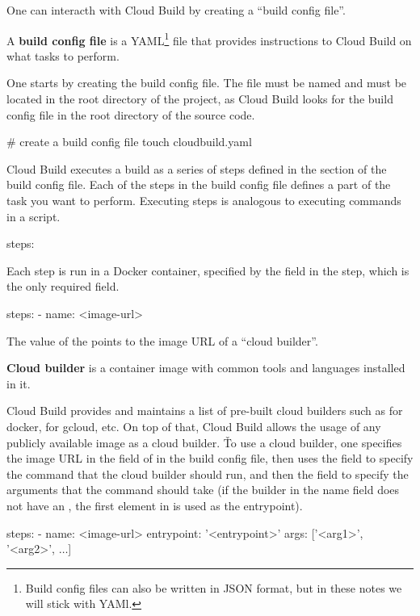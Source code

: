 One can interacth with Cloud Build by creating a ``build config file''.

A \textbf{build config file} is a YAML\footnote{Build config files can also be written in JSON format, but in these
notes we will stick with YAMl.} file that provides instructions to Cloud Build on what tasks to perform.
\ed

One starts by creating the build config file. The file must be named  and must be located in the
root directory of the project, as Cloud Build looks for the build config file in the root directory of the source code.
\begin{bash}
# create a build config file
touch cloudbuild.yaml
\end{bash}

Cloud Build executes a build as a series of steps defined in the  section of the build config file. Each
of the steps in the build config file defines a part of the task you want to perform. Executing steps is analogous
to executing commands in a script.
\begin{block}
steps:
\end{block}

Each step is run in a Docker container, specified by the  field in the step, which is the only required
field.
\begin{block}
steps:
    - name: <image-url>
\end{block}

The value of the  points to the image URL of a ``cloud builder''.

\textbf{Cloud builder} is a container image with common tools and languages installed in it.
\ed

Cloud Build provides and maintains a list of pre-built cloud builders such as  for
docker,  for gcloud, etc. On top of that, Cloud Build allows the usage of any
publicly available image as a cloud builder. \v

To use a cloud builder, one specifies the image URL in the  field of  in the build config file,
then uses the  field to specify the command that the cloud builder should run, and then the 
field to specify the arguments that the command should take (if the builder in the name field does not have an
, the first element in  is used as the entrypoint).
\begin{block}
steps:
    - name: <image-url>
      entrypoint: '<entrypoint>'
      args: ['<arg1>', '<arg2>', $\dots$]
\end{block}

